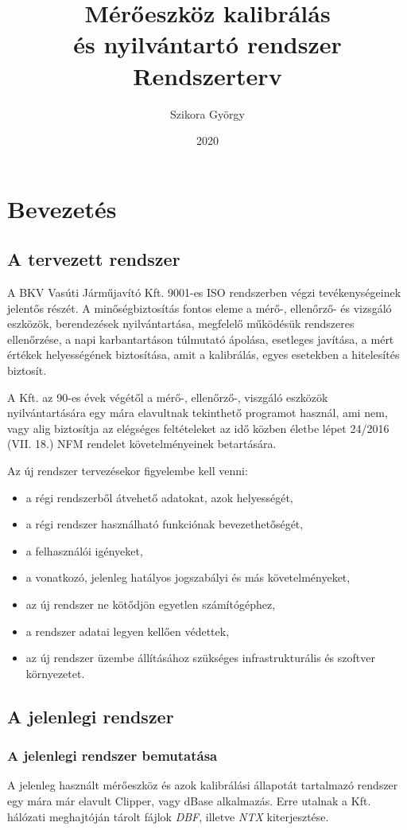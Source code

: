 \documentclass[a4paper,12pt]{report}
\title{%
    \Huge \textbf{Mérőeszköz kalibrálás \\ és nyilvántartó rendszer} \\
    \vspace*{72pt}
    \textbf{Rendszerterv}
    }
\author{Szikora György}
\date{2020}
\begin{document}
\maketitle

\tableofcontents

\part{Bevezetés}
\chapter{A tervezett rendszer}
A BKV Vasúti Járműjavító Kft. 9001-es ISO rendszerben végzi tevékenységeinek 
jelentős részét. A minőségbiztosítás fontos eleme a mérő-, ellenőrző- és 
vizsgáló eszközök, berendezések nyilvántartása, megfelelő működésük rendszeres 
ellenőrzése, a napi karbantartáson túlmutató ápolása, esetleges javítása, a mért 
értékek helyességének biztosítása, amit a kalibrálás, egyes esetekben a 
hitelesítés biztosít.

A Kft. az 90-es évek végétől a mérő-, ellenőrző-, viszgáló eszközök 
nyilvántartására egy mára elavultnak tekinthető programot használ, ami nem,
vagy alig biztosítja az elégséges feltételeket az idő közben életbe lépet 
24/2016 (VII. 18.) NFM rendelet követelményeinek betartására.

Az új rendszer tervezésekor figyelembe kell venni:
\begin{itemize}
\item a régi rendszerből átvehető adatokat, azok helyességét,
\item a régi rendszer használható funkciónak bevezethetőségét,
\item a felhasználói igényeket,
\item a vonatkozó, jelenleg hatályos jogszabályi és más követelményeket,
\item az új rendszer ne kötődjön egyetlen számítógéphez,
\item a rendszer adatai legyen kellően védettek,
\item az új rendszer üzembe állításához szükséges infrastrukturális és szoftver 
környezetet.
\end{itemize}

\chapter{A jelenlegi rendszer}
\section{A jelenlegi rendszer bemutatása}
A jelenleg használt mérőeszköz és azok kalibrálási állapotát tartalmazó rendszer 
egy mára már elavult Clipper, vagy dBase alkalmazás. Erre utalnak a Kft.
hálózati meghajtóján tárolt fájlok \textit{DBF}, illetve \textit{NTX} 
kiterjesztése.
\end{document}
